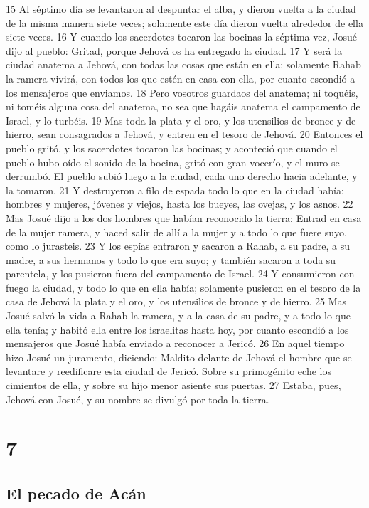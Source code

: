 15 Al séptimo día se levantaron al despuntar el alba, y dieron vuelta a la ciudad de la misma manera siete veces; solamente este día dieron vuelta alrededor de ella siete veces.
16 Y cuando los sacerdotes tocaron las bocinas la séptima vez, Josué dijo al pueblo: Gritad, porque Jehová os ha entregado la ciudad.
17 Y será la ciudad anatema a Jehová, con todas las cosas que están en ella; solamente Rahab la ramera vivirá, con todos los que estén en casa con ella, por cuanto escondió a los mensajeros que enviamos.
18 Pero vosotros guardaos del anatema; ni toquéis, ni toméis alguna cosa del anatema, no sea que hagáis anatema el campamento de Israel, y lo turbéis.
19 Mas toda la plata y el oro, y los utensilios de bronce y de hierro, sean consagrados a Jehová, y entren en el tesoro de Jehová.
20 Entonces el pueblo gritó, y los sacerdotes tocaron las bocinas; y aconteció que cuando el pueblo hubo oído el sonido de la bocina, gritó con gran vocerío, y el muro se derrumbó. El pueblo subió luego a la ciudad, cada uno derecho hacia adelante, y la tomaron.
21 Y destruyeron a filo de espada todo lo que en la ciudad había; hombres y mujeres, jóvenes y viejos, hasta los bueyes, las ovejas, y los asnos.
22 Mas Josué dijo a los dos hombres que habían reconocido la tierra: Entrad en casa de la mujer ramera, y haced salir de allí a la mujer y a todo lo que fuere suyo, como lo jurasteis.
23 Y los espías entraron y sacaron a Rahab, a su padre, a su madre, a sus hermanos y todo lo que era suyo; y también sacaron a toda su parentela, y los pusieron fuera del campamento de Israel.
24 Y consumieron con fuego la ciudad, y todo lo que en ella había; solamente pusieron en el tesoro de la casa de Jehová la plata y el oro, y los utensilios de bronce y de hierro.
25 Mas Josué salvó la vida a Rahab la ramera, y a la casa de su padre, y a todo lo que ella tenía; y habitó ella entre los israelitas hasta hoy, por cuanto escondió a los mensajeros que Josué había enviado a reconocer a Jericó. 
26 En aquel tiempo hizo Josué un juramento, diciendo: Maldito delante de Jehová el hombre que se levantare y reedificare esta ciudad de Jericó. Sobre su primogénito eche los cimientos de ella, y sobre su hijo menor asiente sus puertas. 
27 Estaba, pues, Jehová con Josué, y su nombre se divulgó por toda la tierra.

\chapter{7}

\section*{El pecado de Acán}


